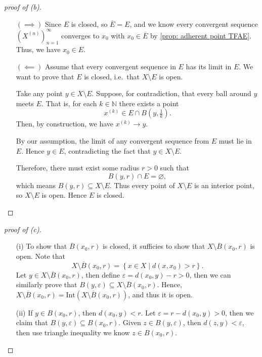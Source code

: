 \begin{proof}[proof of (b)]
    \vphantom{text}
\begin{itemize}
    \item [\((\implies )\)] Since \(E\) is closed, so \(\overline{E} = E \), and we know every convergent sequence \(\left( X^{(n)} \right)_{n=1}^{\infty}  \) converges to \(x_0\) with \(x_0 \in \overline{E} \) by \autoref{prop: adherent point TFAE}. Thus, we have \(x_0 \in E\). 
    \item [\((\impliedby )\)] Assume that every convergent sequence in $E$ has its limit in $E$.  
We want to prove that $E$ is closed, i.e.\ that $X \setminus E$ is open.

Take any point $y \in X \setminus E$.  
Suppose, for contradiction, that every ball around $y$ meets $E$.  
That is, for each $k \in \mathbb{N}$ there exists a point 
\[
x^{(k)} \in E \cap B\!\left(y, \tfrac{1}{k}\right).
\]
Then, by construction, we have $x^{(k)} \to y$.  

By our assumption, the limit of any convergent sequence from $E$ 
must lie in $E$. Hence $y \in E$, contradicting the fact that $y \in X \setminus E$.

Therefore, there must exist some radius $r > 0$ such that
\[
B(y,r) \cap E = \varnothing,
\]
which means $B(y,r) \subseteq X \setminus E$.  
Thus every point of $X \setminus E$ is an interior point, so $X \setminus E$ is open.  
Hence $E$ is closed.
\end{itemize}
\end{proof}
\begin{proof}[proof of (c)]
    \vphantom{text}
    \begin{itemize}
        \item [(i)] To show that \(\overline{B}(x_0, r) \) is closed, it sufficies to show that \(X \setminus \overline{B}(x_0, r) \) is open. Note that 
    \[
        X \setminus \overline{B}(x_0, r) = \left\{ x \in X \mid d(x, x_0) > r \right\}. 
    \]      Let \(y \in X \setminus \overline{B}(x_0, r) \), then define \(\varepsilon = d(x_0, y) - r > 0\), then we can similarly prove that \(B(y, \varepsilon ) \subseteq X \setminus \overline{B}(x_0, r)\).    Hence, \(X \setminus \overline{B}(x_0, r) = \mathrm{Int}(X \setminus \overline{B}(x_0, r) ) \), and thus it is open. 
        \item [(ii)] If \(y \in B(x_0, r)\), then \(d(x_0, y) < r\). Let \(\varepsilon = r - d(x_0, y) > 0\), then we claim that \(B(y, \varepsilon ) \subseteq B(x_0, r)\).  Given \(z \in B(y, \varepsilon )\), then \(d(z, y) < \varepsilon \), then use triangle inequality we know \(z \in B(x_0, r)\).
    \end{itemize}   
\end{proof}
